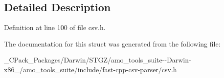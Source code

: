 \subsection{Detailed Description}


Definition at line 100 of file csv.\+h.



The documentation for this struct was generated from the following file\+:\begin{DoxyCompactItemize}
\item 
\+\_\+\+C\+Pack\+\_\+\+Packages/\+Darwin/\+S\+T\+G\+Z/amo\+\_\+tools\+\_\+suite-\/-\/\+Darwin-\/x86\+\_/amo\+\_\+tools\+\_\+suite/include/fast-\/cpp-\/csv-\/parser/csv.\+h\end{DoxyCompactItemize}
